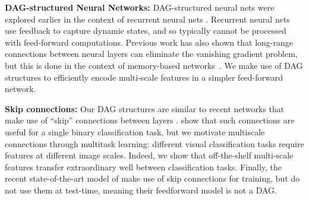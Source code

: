 \documentclass[10pt,twocolumn,letterpaper]{article}
\begin{document}

{\bf DAG-structured Neural Networks:} DAG-structured neural nets were explored earlier in the context of recurrent neural nets \cite{baldi2003principled,graves2009offline}. Recurrent neural nets use feedback to capture dynamic states, and so typically cannot be processed with feed-forward computations. Previous work has also shown that long-range connections between neural layers can eliminate the vanishing gradient problem, but this is done in the context of memory-based networks~\cite{hochreiter1997long}. We make use of DAG structures to efficiently encode multi-scale features in a simpler feed-forward network. 

{\bf Skip connections:} Our DAG structures are similar to recent networks that make use of ``skip'' connections between layers \cite{raiko-aistats-12,szegedy2014going,sermanet2013pedestrian}. \cite{raiko-aistats-12} show that such connections are useful for a single binary classification task, but we motivate multiscale connections through multitask learning: different visual classification tasks require features at different image scales. Indeed, we show that off-the-shelf multi-scale features transfer extraordinary well between classification tasks. Finally, the recent state-of-the-art model of \cite{szegedy2014going} make use of skip connections for training, but do not use them at test-time, meaning their feedforward model is not a DAG. %
\end{document}
